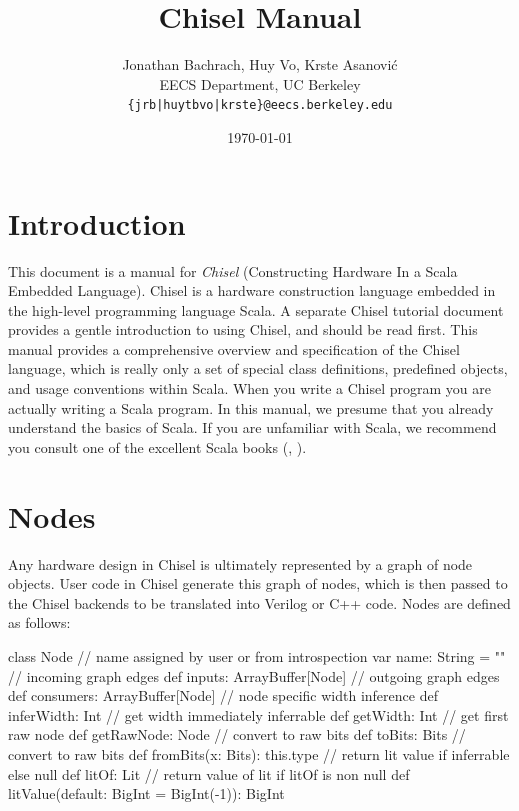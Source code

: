 \documentclass[10pt,twocolumn]{article}
\title{Chisel Manual}
\author{Jonathan Bachrach, Huy Vo, Krste Asanovi\'{c} \\
EECS Department, UC Berkeley\\
{\tt  \{jrb|huytbvo|krste\}@eecs.berkeley.edu}
}
\date{\today}
\begin{document}
\maketitle{}




\section{Introduction}

This document is a manual for {\em Chisel} (Constructing Hardware In a
Scala Embedded Language).  Chisel is a hardware construction language
embedded in the high-level programming language Scala.  A separate
Chisel tutorial document provides a gentle introduction to using
Chisel, and should be read first.  This manual provides a
comprehensive overview and specification of the Chisel language, which
is really only a set of special class definitions, predefined objects,
and usage conventions within Scala.  When you write a Chisel program
you are actually writing a Scala program.  In this manual, we presume
that you already understand the basics of Scala.  If you are
unfamiliar with Scala, we recommend you consult one of the excellent
Scala books (\cite{programming-scala}, \cite{programming-in-scala}).

\section{Nodes}

Any hardware design in Chisel is ultimately represented by a graph of
node objects.  User code in Chisel generate this graph of nodes, which
is then passed to the Chisel backends to be translated into Verilog or
C++ code.  Nodes are defined as follows:

\begin{scala}
class Node {
  // name assigned by user or from introspection
  var name: String = ""
  // incoming graph edges
  def inputs: ArrayBuffer[Node]
  // outgoing graph edges
  def consumers: ArrayBuffer[Node]
  // node specific width inference
  def inferWidth: Int
  // get width immediately inferrable
  def getWidth: Int
  // get first raw node
  def getRawNode: Node
  // convert to raw bits 
  def toBits: Bits
  // convert to raw bits 
  def fromBits(x: Bits): this.type
  // return lit value if inferrable else null
  def litOf: Lit
  // return value of lit if litOf is non null
  def litValue(default: BigInt = BigInt(-1)): BigInt
}
\end{scala}
\end{document}
